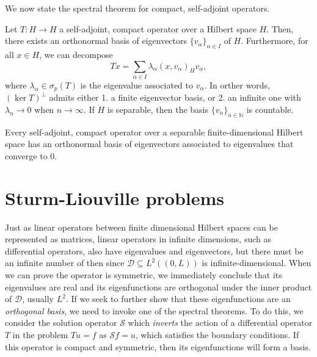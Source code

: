 We now state the spectral theorem for compact, self-adjoint operators. 
\begin{theorem}\label{thm:spectral-compact-selfadjoint}
    Let $T:H\to H$ a self-adjoint, compact operator over a Hilbert space $H$. Then, there exists an orthonormal basis of eigenvectors $\{v_\alpha\}_{\alpha\in I}$ of $H$. Furthermore, for all $x\in H$, we can decompose 
    \begin{equation}
        Tx = \sum_{\alpha\in I} \lambda_\alpha(x,v_\alpha)_H v_\alpha,
    \end{equation}
    where $\lambda_\alpha\in\sigma_p(T)$ is the eigenvalue associated to $v_\alpha$. In orther words, $(\ker T)^\bot$ admits either 1. a finite eigenvector basis, or 2. an infinite one with $\lambda_n\to 0$ when $n\to\infty$. If $H$ is separable, then the basis $\{v_n\}_{n\in \mathbb{N}}$ is countable.
\end{theorem}
\begin{corollary}\label{cor:compact-selfadjoint-eigenvalues-conv-zero}
    Every self-adjoint, compact operator over a separable finite-dimensional Hilbert space has an orthonormal basis of eigenvectors associated to eigenvalues that converge to $0$. 
\end{corollary}

\section{Sturm-Liouville problems}\label{sec:sturm-liouville}
Just as linear operators between finite dimensional Hilbert spaces can be represented as matrices, linear operators in infinite dimensions, such as differential operators, also have eigenvalues and eigenvectors, but there must be an infinite number of then since $\mathcal{D}\subseteq L^2((0,L))$ is infinite-dimensional. When we can prove the operator is symmetric, we immediately conclude that its eigenvalues are real and its eigenfunctions are orthogonal under the inner product of $\mathcal{D}$, usually $L^2$. If we seek to further show that these eigenfunctions are an \emph{orthogonal basis}, we need to invoke one of the spectral theorems. To do this, we consider the solution operator $\mathcal{S}$ which \emph{inverts} the action of a differential operator $T$ in the problem $Tu=f$ as $\mathcal{S}f = u$, which satisfies the boundary conditions. If this operator is compact and symmetric, then its eigenfunctions will form a basis. 


